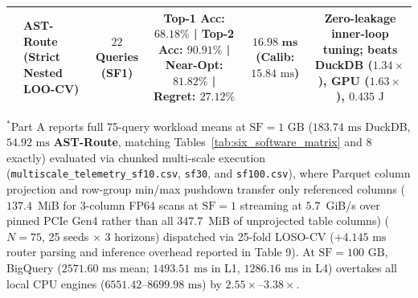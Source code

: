 \documentclass[10pt,a4paper]{article}
\begin{document}
\begin{table}[t!]
{\begin{tabular}{@{}llcccccccc@{}}
 & \textbf{AST-Route (Strict Nested LOO-CV)} & $22$ Queries (SF1) & \multicolumn{5}{c}{Top-1 Acc: $\mathbf{68.18\%}$ | Top-2 Acc: $\mathbf{90.91\%}$ | Near-Opt: $\mathbf{81.82\%}$ | Regret: $\mathbf{27.12\%}$} & $\mathbf{16.98\text{ ms}}$ (Calib: $15.84\text{ ms}$) & Zero-leakage inner-loop tuning; beats DuckDB ($1.34\times$), GPU ($1.63\times$), $0.435\text{ J}$ \\
\bottomrule
\end{tabular}%
}
\vspace{2pt}
\parbox{\textwidth}{\scriptsize $^{*}$Part A reports full 75-query workload means at $\text{SF}=1\text{ GB}$ ($183.74\text{ ms}$ DuckDB, $54.92\text{ ms}$ \textbf{AST-Route}, matching Tables~\ref{tab:six_software_matrix} and 8 exactly) evaluated via chunked multi-scale execution (\texttt{multiscale\_telemetry\_sf10.csv}, \texttt{sf30}, and \texttt{sf100.csv}), where Parquet column projection and row-group min/max pushdown transfer only referenced columns ($137.4$~MiB for 3-column FP64 scans at $\mathrm{SF}=1$ streaming at $5.7$~GiB/s over pinned PCIe Gen4 rather than all $347.7$~MiB of unprojected table columns) ($N=75$, 25 seeds $\times$ 3 horizons) dispatched via 25-fold LOSO-CV ($+4.145\text{ ms}$ router parsing and inference overhead reported in Table 9). At $\text{SF}=100\text{ GB}$, BigQuery ($2571.60\text{ ms}$ mean; $1493.51\text{ ms}$ in L1, $1286.16\text{ ms}$ in L4) overtakes all local CPU engines ($6551.42\text{--}8699.98\text{ ms}$) by $\mathbf{2.55\times\text{--}3.38\times}$.}
\end{table}
\end{document}
